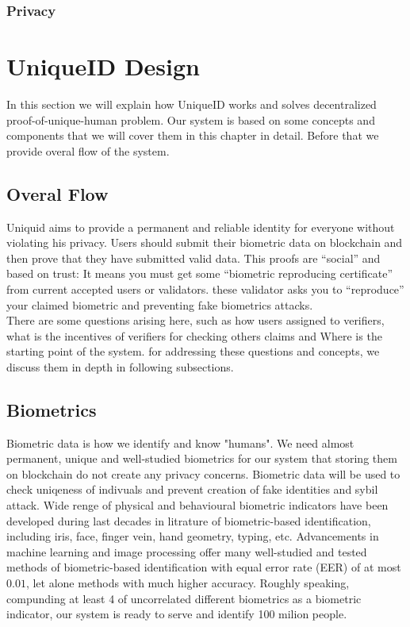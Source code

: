 \documentclass{article}
\begin{document}
\subsubsection{Privacy}



\section{ UniqueID Design}
In this section we will explain how UniqueID works and solves decentralized proof-of-unique-human problem. Our system is based on some concepts and components that we will cover them in this chapter in detail. Before that we provide overal flow of the system.

\subsection{Overal Flow}

  Uniquid aims to provide a permanent and reliable identity for everyone without violating his privacy.  Users should submit their biometric data on blockchain and then prove that they have submitted valid data. This proofs are “social” and based on trust: It means you must get some “biometric reproducing certificate” from current accepted users or validators. these validator asks you to “reproduce” your claimed biometric and preventing fake biometrics attacks.
  \\
  There are some questions arising here, such as how users assigned to verifiers, what is the incentives of verifiers for checking others claims and Where is the starting point of the system. for addressing these questions and concepts, we discuss them in depth in following subsections.
\subsection{Biometrics}
Biometric data is how we identify and know "humans". We need almost permanent, unique and well-studied biometrics for our system that storing them on blockchain do not create any privacy concerns. 
Biometric data will be used to check uniqeness of indivuals and prevent creation of fake identities and sybil attack. Wide renge of physical and behavioural biometric indicators have been developed during last decades in litrature of biometric-based identification, including iris, face, finger vein, hand geometry, typing, etc. Advancements in machine learning and image processing offer many well-studied and tested methods of biometric-based identification with equal error rate (EER) of at most $0.01$, let alone methods with much higher accuracy. Roughly speaking, compunding at least 4 of uncorrelated different biometrics as a biometric indicator, our system is ready to serve and identify 100 milion people.\\
\end{document}
